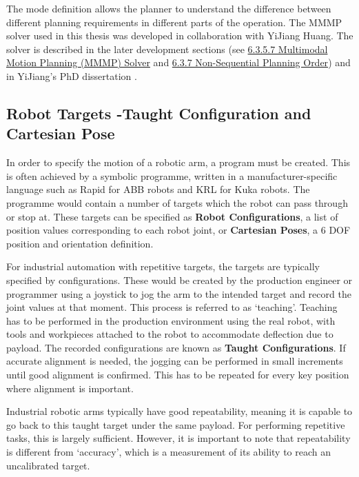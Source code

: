 The mode definition allows the planner to understand the difference between different planning requirements in different parts of the operation. The MMMP solver used in this thesis was developed in collaboration with YiJiang Huang. The solver is described in the later development sections (see \ul{6.3.5.7 Multimodal Motion Planning (MMMP) Solver} and \ul{6.3.7 Non-Sequential Planning Order}) and in YiJiang’s PhD dissertation \parencite{huangAlgorithmicPlanningRobotic2022}.

\subsection{Robot Targets -Taught Configuration and Cartesian Pose}
\label{subsection:exploration_3_robot_targets_taught_configuration_and_cartesian_pose}

In order to specify the motion of a robotic arm, a program must be created. This is often achieved by a symbolic programme, written in a manufacturer-specific language such as Rapid for ABB robots and KRL for Kuka robots. The programme would contain a number of targets which the robot can pass through or stop at. These targets can be specified as \textbf{Robot Configurations}, a list of position values corresponding to each robot joint, or \textbf{Cartesian Poses}, a 6 DOF position and orientation definition.

For industrial automation with repetitive targets, the targets are typically specified by configurations. These would be created by the production engineer or programmer using a joystick to jog the arm to the intended target and record the joint values at that moment. This process is referred to as ‘teaching’. Teaching has to be performed in the production environment using the real robot, with tools and workpieces attached to the robot to accommodate deflection due to payload. The recorded configurations are known as \textbf{Taught Configurations}. If accurate alignment is needed, the jogging can be performed in small increments until good alignment is confirmed. This has to be repeated for every key position where alignment is important. 

Industrial robotic arms typically have good repeatability, meaning it is capable to go back to this taught target under the same payload. For performing repetitive tasks, this is largely sufficient. However, it is important to note that repeatability is different from ‘accuracy’, which is a measurement of its ability to reach an uncalibrated target. 

